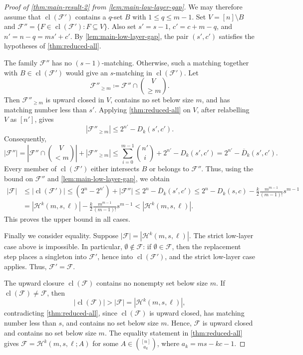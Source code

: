 \documentclass[10pt,a4paper]{article}
\numberwithin{equation}{section}
\theoremstyle{definition}
\newcommand{\F}{\mathcal F}
\newcommand{\cl}{\operatorname{cl}}
\begin{document}
\begin{proof}[Proof of \cref{thm:main-result-2} from \cref{lem:main-low-layer-gap}]
        We may therefore assume that $\cl(\F')$ contains a $q$-set $B$ with $1\le q\le m-1$.
        Set $V=[n]\setminus B$ and $\F''=\{F\in\cl(\F'):F\subseteq V\}$.
        Also set $s'=s-1$, $c'=c+m-q$, and $n'=n-q=ms'+c'$.
        By \cref{lem:main-low-layer-gap}, the pair $(s',c')$ satisfies the hypotheses of \cref{thm:reduced-all}.

        The family $\F''$ has no $(s-1)$-matching.
        Otherwise, such a matching together with $B\in\cl(\F')$ would give an $s$-matching in $\cl(\F')$.
        Let
        \[
                \F''_{\ge m}\coloneqq
                \F''\cap\binom V{\ge m}.
        \]
        Then $\F''_{\ge m}$ is upward closed in $V$, contains no set below size $m$, and has matching number less than $s'$.
        Applying \cref{thm:reduced-all} on $V$, after relabelling $V$ as $[n']$, gives
        \[
                |\F''_{\ge m}|\le 2^{n'}-D_k(s',c').
        \]
        Consequently,
        \[
                |\F''|=
                \left|\F''\cap\binom V{<m}\right|
                +|\F''_{\ge m}| \le
                \sum_{i=0}^{m-1}\binom{n'}i
                +2^{n'}-D_k(s',c')  =2^{n'}-\overline D_k(s',c').
        \]
        Every member of $\cl(\F')$ either intersects $B$ or belongs to $\F''$.
        Thus, using the bound on $\F''$ and \cref{lem:main-low-layer-gap}, we obtain
        \[
                \begin{aligned}
                        |\F|
                         & \le |\cl(\F')|
                        \le (2^n-2^{n'})+|\F''|
                        \le 2^n-\overline{D}_k(s',c')  \le 2^n-D_k(s,c)
                        -\frac{k}{2}\frac{m^{m-1}}{(m-1)!}s^{m-1} \\
                         & =|\mathcal H^k(m,s,\ell)|
                        -\frac{k}{2}\frac{m^{m-1}}{(m-1)!}s^{m-1}  <|\mathcal H^k(m,s,\ell)|.
                \end{aligned}
        \]
        This proves the upper bound in all cases.

        Finally we consider equality.
        Suppose $|\F|=|\mathcal H^k(m,s,\ell)|$.
        The strict low-layer case above is impossible.
        In particular, $\emptyset\notin\F$: if $\emptyset\in\F$, then the replacement step places a singleton into $\F'$, hence into $\cl(\F')$, and the strict low-layer case applies.
        Thus, $\F'=\F$.

        The upward closure $\cl(\F)$ contains no nonempty set below size $m$.
        If $\cl(\F)\ne\F$, then
        \[
                |\cl(\F)|>|\F|=|\mathcal H^k(m,s,\ell)|,
        \]
        contradicting \cref{thm:reduced-all}, since $\cl(\F)$ is upward closed, has matching number less than $s$, and contains no set below size $m$.
        Hence, $\F$ is upward closed and contains no set below size $m$.
        The equality statement in \cref{thm:reduced-all} gives $\F=\mathcal H^k(m,s,\ell;A)$ for some $A\in\binom{[n]}{a_k}$, where $a_k=ms-kc-1$.
\end{proof}
\end{document}
